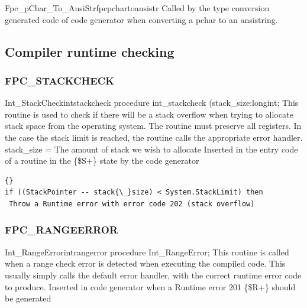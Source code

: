 \documentclass [12pt]{article}
\begin{document}
\begin{functionl}{Fpc{\_}pChar{\_}To{\_}AnsiStr}{fpcpchartoansistr}
\Notes 
Called by the type conversion generated code of code generator when
converting a pchar to an ansistring.
\end{functionl}

\ifpdf 
 \clearpage
\fi

\subsection{Compiler runtime checking}
\label{subsec:compiler}

\subsubsection{FPC{\_}STACKCHECK}
\label{subsubsec:mylabel51}

\begin{procedurel}{Int{\_}StackCheck}{intstackcheck}
\Declaration
procedure int{\_}stackcheck (stack{\_}size:longint;
\Description 
This routine is used to check if there will be a stack overflow when trying
to allocate stack space from the operating system. The routine must preserve
all registers. In the case the stack limit is reached, the routine calls the
appropriate error handler.
\Parameters 
stack{\_}size = The amount of stack we wish to allocate 
\Notes 
Inserted in the entry code of a routine in the {\{}{\$}S+{\}} state by the code generator 
\Algorithm
\begin{lstlisting}{}
if ((StackPointer -- stack{\_}size) < System.StackLimit) then
 Throw a Runtime error with error code 202 (stack overflow)
\end{lstlisting}
\end{procedurel}

\clearpage
\subsubsection{FPC{\_}RANGEERROR}
\label{subsubsec:mylabel52}

\begin{procedurel}{Int{\_}RangeError}{intrangerror}
\Declaration
procedure Int{\_}RangeError;
\Description 
This routine is called when a range check error is detected when executing
the compiled code. This usually simply calls the default error handler, with
the correct runtime error code to produce.
\Parameters 
Inserted in code generator when a Runtime error 201 {\{}{\$}R+{\}} should be
generated 
\end{procedurel}
\end{document}
